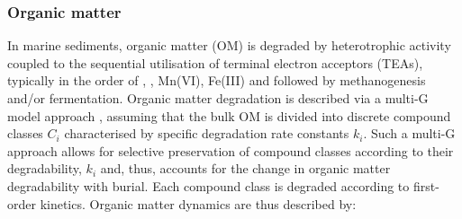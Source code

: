 \documentclass[gmd, manuscript]{copernicus}
\begin{document}
\subsubsection{Organic matter}
In marine sediments, organic matter (OM) is degraded by heterotrophic activity coupled to the sequential utilisation of terminal electron acceptors (TEAs), typically in the order of , , Mn(VI), Fe(III) and 
 followed by methanogenesis and/or fermentation. Organic matter degradation is described via a multi-G model approach \citep[][and references therein]{arndt_quantifying_2013}, assuming that the bulk OM is divided 
into discrete compound classes $C_i$ characterised by specific degradation rate constants $k_i$. Such a multi-G approach allows for selective preservation of compound classes according to their degradability, $k_i$ and, thus, 
accounts for the change in organic matter degradability with burial. Each compound class is degraded according to first-order kinetics. Organic matter dynamics are thus described by:
\end{document}

